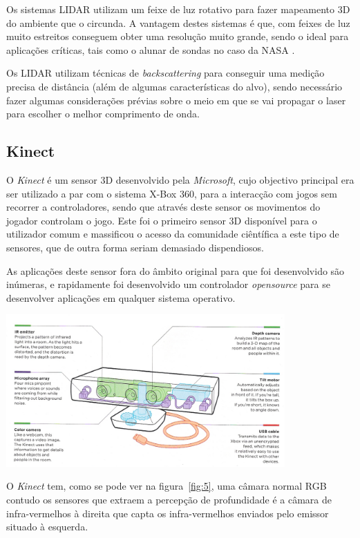 Os sistemas LIDAR utilizam um feixe de luz rotativo para fazer mapeamento 3D
do ambiente que o circunda. A vantagem destes sistemas é que, com feixes de
luz muito estreitos conseguem obter uma resolução muito grande, sendo o ideal
para aplicações críticas, tais como o alunar de sondas no caso da NASA \cite{Keim2010}.

Os LIDAR utilizam técnicas de \emph{backscattering} para conseguir uma medição
precisa de distância (além de algumas características do alvo), sendo necessário
fazer algumas considerações prévias sobre o meio em que se vai propagar o laser
para escolher o melhor comprimento de onda.


\subsection{Kinect}
O \emph{Kinect} é um sensor 3D desenvolvido pela \emph{Microsoft}, cujo objectivo principal era
ser utilizado a par com o sistema X-Box 360, para a interacção com jogos sem recorrer
a controladores, sendo que através deste sensor os movimentos do jogador controlam o
jogo. Este foi o primeiro sensor 3D disponível para o utilizador comum e massificou o
acesso da comunidade ciêntífica a este tipo de sensores, que de outra forma seriam
demasiado dispendiosos.

As aplicações deste sensor fora do âmbito original para que foi desenvolvido são inúmeras,
e rapidamente foi desenvolvido um controlador \emph{opensource} para se desenvolver aplicações
em qualquer sistema operativo.

\begin{center}
	\includegraphics[width=0.80\textwidth]{figures/Kinect.png}
	\label{fig:5}
\end{center}

O \emph{Kinect} tem, como se pode ver na figura~\ref{fig:5}, uma câmara normal RGB 
contudo os sensores que extraem a percepção de profundidade é a câmara de infra-vermelhos à direita
que capta os infra-vermelhos enviados pelo emissor situado à esquerda.

